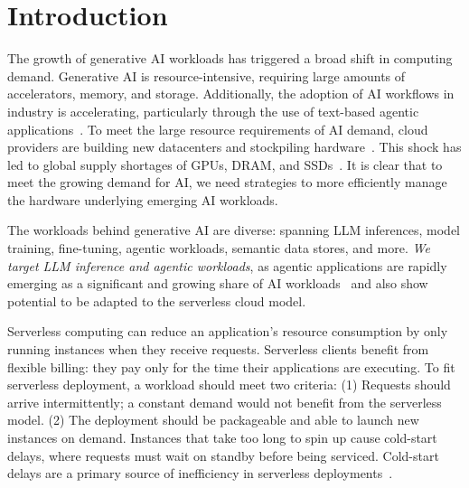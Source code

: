\section{Introduction}



The growth of generative AI workloads has triggered a broad shift in computing demand.
Generative AI is resource-intensive, requiring large amounts of accelerators, memory, and storage.
Additionally, the adoption of AI workflows in industry is accelerating, particularly through the use of text-based agentic applications~\cite{flexera2026cloud, cloudera2025agents, vizard2025agentic}.
To meet the large resource requirements of AI demand, cloud providers are building new datacenters and stockpiling hardware~\cite{gvr2023datacenter}.
This shock has led to global supply shortages of GPUs, DRAM, and SSDs~\cite{cnbc2026micron, jeronimo2025memory}.
It is clear that to meet the growing demand for AI, we need strategies to more efficiently manage the hardware underlying emerging AI workloads. 

The workloads behind generative AI are diverse: spanning LLM inferences, model training, fine-tuning, agentic workloads, semantic data stores, and more.
\textit{We target LLM inference and agentic workloads}, as agentic applications are rapidly emerging as a significant and growing share of AI workloads~\cite{flexera2026cloud, cloudera2025agents, menlo2025midyear} and also show potential to be adapted to the serverless cloud model.


Serverless computing can reduce an application's resource consumption by only running instances when they receive requests.
Serverless clients benefit from flexible billing: they pay only for the time their applications are executing.
To fit serverless deployment, a workload should meet two criteria: 
(1) Requests should arrive intermittently; a constant demand would not benefit from the serverless model. 
(2) The deployment should be packageable and able to launch new instances on demand.
Instances that take too long to spin up cause cold-start delays, where requests must wait on standby before being serviced.
Cold-start delays are a primary source of inefficiency in serverless deployments~\cite{lambda, faascache, catalyzer, medes, qiu2023userguidedpagemergingmemory}.

